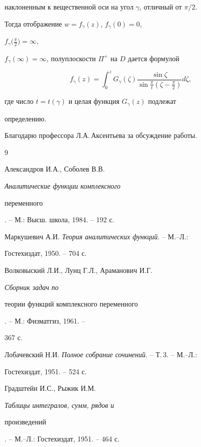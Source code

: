 наклоненным к вещественной оси на угол $\gamma$, отличный от $\pi/2$. 


Тогда отображение $w=f_\gamma(z)$, $f_\gamma(0)=0$, 


$f_\gamma\big(\frac{\pi}{2}\big)=\infty$, 


$f_\gamma(\infty)=\infty$, полуплоскости $\Pi^+$ на $D$ дается формулой 


$$ 


f_\gamma(z)=\int^z_0 G_\gamma(\zeta) 


\frac{\sin\zeta}{\sin\frac{\pi}{t}(\zeta-\frac{\pi}{2})}d\zeta, 


$$ 


где число $t=t(\gamma)$ и целая функция $G_\gamma(z)$ подлежат 


определению. 


 


Благодарю профессора Л.А.\,Аксентьева за обсуждение работы. 


 


\begin{thebibliography}{9} 


 




Александров И.А., Соболев В.В. {\em Аналитические функции комплексного 


переменного}. -- М.: Высш. школа, 1984. -- 192 с. 




Маркушевич А.И. {\em Теория аналитических функций}. -- М.--Л.: 


Гостехиздат, 1950. -- 704 с. 




Волковыский Л.И., Лунц Г.Л., Араманович И.Г. {\em Сборник задач по 


теории функций комплексного переменного}. -- М.: Физматгиз, 1961. -- 


367 с. 




Лобачевский Н.И. {\em Полное собрание сочинений}. -- Т.\,3. -- М.--Л.: 


Гостехиздат, 1951. -- 524 с. 




Градштейн И.С., Рыжик И.М. {\em Таблицы интегралов, сумм, рядов и 


произведений}. -- М.--Л.: Гостехиздат, 1951. -- 464 с. 


 


 


\end{thebibliography} 


 


\vskip 2cm 


 






 


\label{end} 


 



